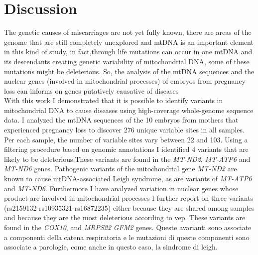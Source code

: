 \chapter{Discussion}
The genetic causes of miscarriages are not yet fully known, there are areas of the genome that are still completely unexplored and  mtDNA is an important element in this kind of study, in fact,through life mutations can occur in one mtDNA and its descendants creating genetic variability of mitochondrial DNA, some of these mutations might be deleterious. So, the analysis of the mtDNA sequences and the nuclear genes (involved in mitochondrial processes) of embryos from pregnancy loss can informs on genes putatively causative of diseases \\

 With this work I demonstrated that it is possible to identify variants in mitochondrial DNA to cause diseases using high-coverage whole-genome sequence data.
 I analyzed the mtDNA sequences of the 10 embryos from mothers that experienced pregnancy loss to discover 276 unique variable sites in all samples. Per each sample, the number of variable sites vary between 22 and 103. Using a filtering procedure  based on genomic annotations I identified 4 variants that are likely to be deleterious,These variants are found in the \textit {MT-ND2}, \textit{MT-ATP6} and \textit{MT-ND6} genes. 
Pathogenic variants of the mitochondrial gene \textit{MT-ND2} are known to cause mtDNA-associated Leigh syndrome, as are variants of \textit{MT-ATP6} and \textit{MT-ND6}. 
Furthermore I have analyzed variation in nuclear genes whose product are involved in mitochondrial processes  
I further report on three variants (rs2159132-rs10935321-rs16872235) either because they are shared among samples and because they are the most deleterious according to vep. These variants are found in the \textit{COX10}, and \textit{MRPS22} \textit{GFM2} genes.
Queste avarianti sono associate a componenti della catena respiratoria e le mutazioni di queste componenti sono associate a parologie, come anche in questo caso, la sindrome di leigh.




